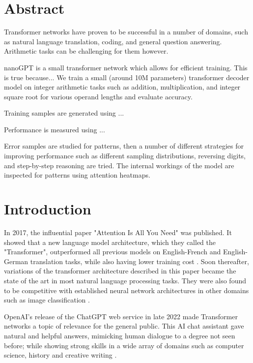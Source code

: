 \thispagestyle{empty}

\section*{Abstract}

Transformer networks have proven to be successful in a number of domains, such as natural language translation, coding, and general question answering. Arithmetic tasks can be challenging for them however.

nanoGPT is a small transformer network which allows for efficient training. This is true because...
We train a small (around 10M parameters) transformer decoder model on integer arithmetic tasks such as addition, multiplication, and integer square root for various operand lengths and evaluate accuracy.

Training samples are generated using ...

Performance is measured using ...

Error samples are studied for patterns, then a number of different strategies for improving performance such as different sampling distributions, reversing digits, and step-by-step reasoning are tried. The internal workings of the model are inspected for patterns using attention heatmaps.

\clearpage

\tableofcontents
\clearpage

\section{Introduction}

In 2017, the influential paper "Attention Is All You Need" \cite{allyouneed} was published. It showed that a new language model architecture, which they called the "Transformer", outperformed all previous models on English-French and English-German translation tasks, while also having lower training cost . Soon thereafter, variations of the transformer architecture described in this paper became the state of the art in most natural language processing tasks. They were also found to be competitive with established neural network architectures in other domains such as image classification .

OpenAI's release of the ChatGPT web service in late 2022 \cite{openai_chatgpt_2022} made Transformer networks a topic of relevance for the general public. This AI chat assistant gave natural and helpful answers, mimicking human dialogue to a degree not seen before; while showing strong skills in a wide array of domains such as computer science, history and creative writing \cite{Savelka_2023} .


